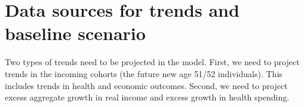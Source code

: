 \section{Data sources for trends and baseline scenario}
Two types of trends need to be projected in the model. First, we need to project trends in the 
incoming cohorts (the future new age 51/52 individuals). This includes trends in health and economic 
outcomes. Second, we need to project excess aggregate growth in real income and excess growth in 
health spending.





